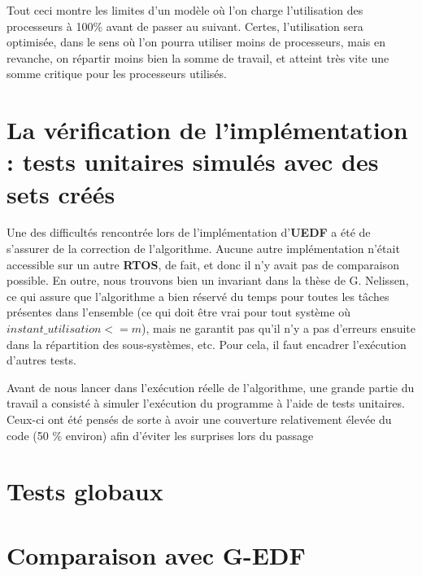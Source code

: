 	Tout ceci montre les limites d'un modèle où l'on charge l'utilisation des processeurs à 100\% avant de 
	passer au suivant. Certes, l'utilisation sera optimisée, dans le sens où l'on 
	pourra utiliser moins de processeurs, mais en revanche, on 
	répartir moins bien la somme de travail, et atteint très vite une somme critique pour les processeurs utilisés.

\section{La vérification de l'implémentation : tests unitaires simulés avec des sets créés}

	Une des difficultés rencontrée lors de l'implémentation d'\textbf{UEDF} a été de s'assurer de la correction de l'algorithme. 
	Aucune autre implémentation n'était accessible sur un autre \textbf{RTOS}, de fait, et donc il n'y avait pas de 
	comparaison possible. En outre, nous trouvons bien un invariant dans la thèse de G. Nelissen, ce qui assure 
	que l'algorithme a bien réservé du temps pour toutes les tâches présentes dans l'ensemble 
	(ce qui doit être vrai pour tout système où $instant\_utilisation <= m$), mais ne garantit pas 
	qu'il n'y a pas d'erreurs ensuite dans la répartition des sous-systèmes, etc. Pour cela, il faut encadrer 
	l'exécution d'autres tests. \newline

	Avant de nous lancer dans l'exécution réelle de l'algorithme, une grande partie du travail a consisté 
	à simuler l'exécution du programme à l'aide de tests unitaires. Ceux-ci ont été pensés de sorte à avoir 
	une couverture relativement élevée du code (50 \% environ) afin d'éviter les surprises lors du passage 
	

\section{Tests globaux}

\section{Comparaison avec G-EDF}

